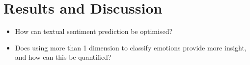 

 


\section{Results and Discussion}
\begin{itemize}
    \item How can textual sentiment prediction be optimised?
    \item Does using more than 1 dimension to classify emotions provide more insight, and how can this be quantified?
\end{itemize}